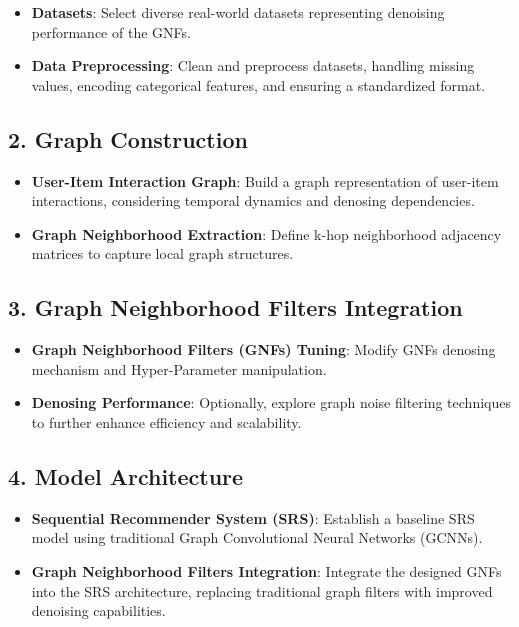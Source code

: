 \documentclass[journal]{IEEEtran}
\begin{document}
\begin{itemize}
  \item \textbf{Datasets}: Select diverse real-world datasets representing denoising performance of the GNFs.
  \item \textbf{Data Preprocessing}: Clean and preprocess datasets, handling missing values, encoding categorical features, and ensuring a standardized format.
\end{itemize}

\subsection*{2. Graph Construction}

\begin{itemize}
  \item \textbf{User-Item Interaction Graph}: Build a graph representation of user-item interactions, considering temporal dynamics and denosing dependencies.
  \item \textbf{Graph Neighborhood Extraction}: Define k-hop neighborhood adjacency matrices to capture local graph structures.
\end{itemize}

\subsection*{3. Graph Neighborhood Filters Integration}

\begin{itemize}
  \item \textbf{Graph Neighborhood Filters (GNFs) Tuning}: Modify GNFs denosing mechanism and Hyper-Parameter manipulation.
  \item \textbf{Denosing Performance}: Optionally, explore graph noise filtering techniques to further enhance efficiency and scalability.
\end{itemize}

\subsection*{4. Model Architecture}

\begin{itemize}
  \item \textbf{Sequential Recommender System (SRS)}: Establish a baseline SRS model using traditional Graph Convolutional Neural Networks (GCNNs).
  \item \textbf{Graph Neighborhood Filters Integration}: Integrate the designed GNFs into the SRS architecture, replacing traditional graph filters with improved denoising capabilities.
\end{itemize}
\end{document}
